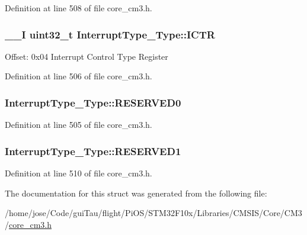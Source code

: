Definition at line 508 of file core\-\_\-cm3.\-h.

\hypertarget{struct_interrupt_type___type_a2b10f6d37363a6b798ac97f4c4db1e63}{
\subsubsection[{I\-C\-T\-R}]{\setlength{\rightskip}{0pt plus 5cm}\-\_\-\-\_\-\-I {\bf uint32\-\_\-t} Interrupt\-Type\-\_\-\-Type\-::\-I\-C\-T\-R}}\label{struct_interrupt_type___type_a2b10f6d37363a6b798ac97f4c4db1e63}
Offset\-: 0x04 Interrupt Control Type Register 

Definition at line 506 of file core\-\_\-cm3.\-h.

\hypertarget{struct_interrupt_type___type_ae0d588643b0488fce4c0a90b85edf362}{
\subsubsection[{R\-E\-S\-E\-R\-V\-E\-D0}]{ Interrupt\-Type\-\_\-\-Type\-::\-R\-E\-S\-E\-R\-V\-E\-D0}}\label{struct_interrupt_type___type_ae0d588643b0488fce4c0a90b85edf362}


Definition at line 505 of file core\-\_\-cm3.\-h.

\hypertarget{struct_interrupt_type___type_a45933eb981309d50f943ec3af67f17be}{
\subsubsection[{R\-E\-S\-E\-R\-V\-E\-D1}]{ Interrupt\-Type\-\_\-\-Type\-::\-R\-E\-S\-E\-R\-V\-E\-D1}}\label{struct_interrupt_type___type_a45933eb981309d50f943ec3af67f17be}


Definition at line 510 of file core\-\_\-cm3.\-h.



The documentation for this struct was generated from the following file\-:\begin{DoxyCompactItemize}
\item 
/home/jose/\-Code/gui\-Tau/flight/\-Pi\-O\-S/\-S\-T\-M32\-F10x/\-Libraries/\-C\-M\-S\-I\-S/\-Core/\-C\-M3/\hyperlink{_s_t_m32_f10x_2_libraries_2_c_m_s_i_s_2_core_2_c_m3_2core__cm3_8h}{core\-\_\-cm3.\-h}\end{DoxyCompactItemize}
